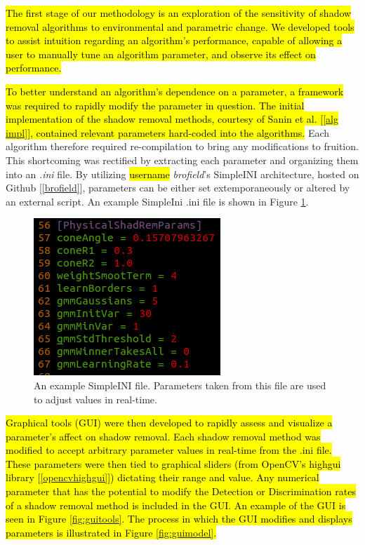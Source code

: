 \documentclass[12pt]{report}
\begin{document}
\hl{The first stage of our methodology is an exploration of the sensitivity of shadow removal algorithms to environmental and parametric change. We developed tools to assist intuition regarding an algorithm's performance, capable of allowing a user to manually tune an algorithm parameter, and observe its effect on performance.}

\hl{To better understand an algorithm's dependence on a parameter, a framework was required to rapidly modify the parameter in question. The initial implementation of the shadow removal methods, courtesy of Sanin et al. [\ref{alg impl}], contained relevant parameters hard-coded into the algorithms.} Each algorithm therefore required re-compilation to bring any modifications to fruition. This shortcoming was rectified by extracting each parameter and organizing them into an \textit{.ini} file. By utilizing \hl{username} \textit{brofield}'s SimpleINI architecture, hosted on Github [\ref{brofield}], parameters can be either set extemporaneously or altered by an external script. An example SimpleIni .ini file is shown in Figure \ref{fig:simpleini}.

\begin{figure}
  \centering
 \includegraphics[width=.5\linewidth]{figures/simpleini.png}
  \caption{An example SimpleINI file. Parameters taken from this file are used to adjust values in real-time.}
  \label{fig:simpleini}
\end{figure}

\hl{Graphical tools (GUI) were then developed to rapidly assess and visualize a parameter's affect on shadow removal. Each shadow removal method was modified to accept arbitrary parameter values in real-time from the .ini file. These parameters were then tied to graphical sliders (from OpenCV's highgui library [\ref{opencvhighgui}]) dictating their range and value. Any numerical parameter that has the potential to modify the Detection or Discrimination rates of a shadow removal method is included in the GUI. An example of the GUI is seen in Figure \ref{fig:guitools}. The process in which the GUI modifies and displays parameters is illustrated in Figure \ref{fig:guimodel}.}
\end{document}
